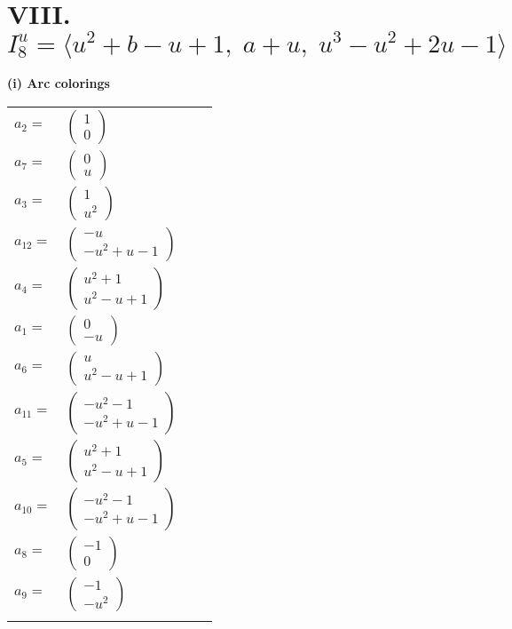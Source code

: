 \documentclass[1p]{elsarticle_modified}
\theoremstyle{definition}
\begin{document}
\centering \section*{VIII. $I^u_{8}= \langle u^2+b- u+1,\;a+u,\;u^3- u^2+2 u-1 \rangle$}
\flushleft \textbf{(i) Arc colorings}\\
\begin{tabular}{m{7pt} m{180pt} m{7pt} m{180pt} }
\flushright $a_{2}=$&$\begin{pmatrix}1\\0\end{pmatrix}$ \\
\flushright $a_{7}=$&$\begin{pmatrix}0\\u\end{pmatrix}$ \\
\flushright $a_{3}=$&$\begin{pmatrix}1\\u^2\end{pmatrix}$ \\
\flushright $a_{12}=$&$\begin{pmatrix}- u\\- u^2+u-1\end{pmatrix}$ \\
\flushright $a_{4}=$&$\begin{pmatrix}u^2+1\\u^2- u+1\end{pmatrix}$ \\
\flushright $a_{1}=$&$\begin{pmatrix}0\\- u\end{pmatrix}$ \\
\flushright $a_{6}=$&$\begin{pmatrix}u\\u^2- u+1\end{pmatrix}$ \\
\flushright $a_{11}=$&$\begin{pmatrix}- u^2-1\\- u^2+u-1\end{pmatrix}$ \\
\flushright $a_{5}=$&$\begin{pmatrix}u^2+1\\u^2- u+1\end{pmatrix}$ \\
\flushright $a_{10}=$&$\begin{pmatrix}- u^2-1\\- u^2+u-1\end{pmatrix}$ \\
\flushright $a_{8}=$&$\begin{pmatrix}-1\\0\end{pmatrix}$ \\
\flushright $a_{9}=$&$\begin{pmatrix}-1\\- u^2\end{pmatrix}$\\&\end{tabular}
\end{document}
